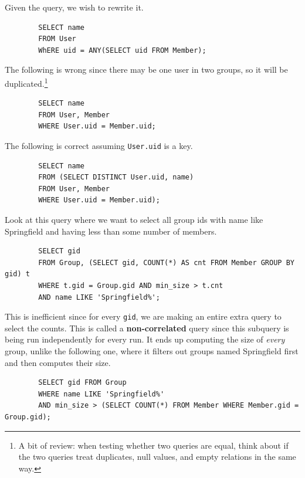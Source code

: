 \documentclass{article}
\begin{document}
    \begin{example}
      Given the query, we wish to rewrite it. 
      \begin{lstlisting}
        SELECT name 
        FROM User 
        WhERE uid = ANY(SELECT uid FROM Member);
      \end{lstlisting}

      The following is wrong since there may be one user in two groups, so it will be duplicated.\footnote{A bit of review: when testing whether two queries are equal, think about if the two queries treat duplicates, null values, and empty relations in the same way. } 
      \begin{lstlisting}
        SELECT name 
        FROM User, Member 
        WHERE User.uid = Member.uid;
      \end{lstlisting} 

      The following is correct assuming \texttt{User.uid} is a key. 
      \begin{lstlisting}
        SELECT name 
        FROM (SELECT DISTINCT User.uid, name) 
        FROM User, Member 
        WHERE User.uid = Member.uid); 
      \end{lstlisting}
    \end{example}

    \begin{example}
      Look at this query where we want to select all group ids with name like Springfield and having less than some number of members. 
      \begin{lstlisting}
        SELECT gid 
        FROM Group, (SELECT gid, COUNT(*) AS cnt FROM Member GROUP BY gid) t 
        WHERE t.gid = Group.gid AND min_size > t.cnt 
        AND name LIKE 'Springfield%';
      \end{lstlisting}
      This is inefficient since for every \texttt{gid}, we are making an entire extra query to select the counts. This is called a \textbf{non-correlated} query since this subquery is being run independently for every run. It ends up computing the size of \textit{every} group, unlike the following one, where it filters out groups named Springfield first and then computes their size. 
      \begin{lstlisting}
        SELECT gid FROM Group 
        WHERE name LIKE 'Springfield%' 
        AND min_size > (SELECT COUNT(*) FROM Member WHERE Member.gid = Group.gid);
      \end{lstlisting}
    \end{example}
  
\end{document}
